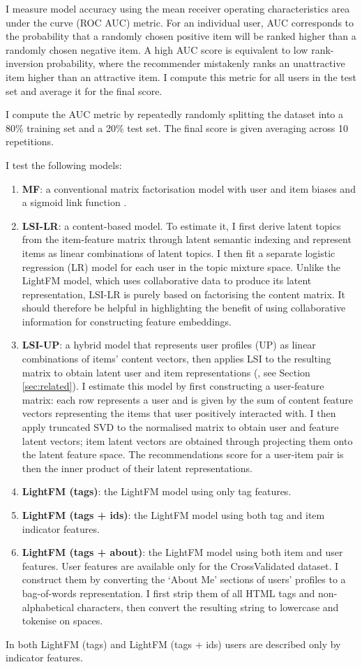 \documentclass{sig-alternate}
\begin{document}
I measure model accuracy using the mean receiver operating characteristics area under the curve (ROC AUC) metric. For an individual user, AUC corresponds to the probability that a randomly chosen positive item will be ranked higher than a randomly chosen negative item. A high AUC score is equivalent to low rank-inversion probability, where the recommender mistakenly ranks an unattractive item higher than an attractive item. I compute this metric for all users in the test set and average it for the final score.

I compute the AUC metric by repeatedly randomly splitting the dataset into a 80\% training set and a 20\% test set. The final score is given averaging across 10 repetitions.

I test the following models:
\begin{enumerate}
\item \textbf{MF}: a conventional matrix factorisation model with user and item biases and a sigmoid link function \cite{koren2009matrix}.
\item \textbf{LSI-LR}: a content-based model. To estimate it, I first derive latent topics from the item-feature matrix through latent semantic indexing and represent items as linear combinations of latent topics. I then fit a separate logistic regression (LR) model for each user in the topic mixture space. Unlike the LightFM model, which uses collaborative data to produce its latent representation, LSI-LR is purely based on factorising the content matrix. It should therefore be helpful in highlighting the benefit of using collaborative information for constructing feature embeddings.
\item \textbf{LSI-UP}: a hybrid model that represents user profiles (UP) as linear combinations of items' content vectors, then applies LSI to the resulting matrix to obtain latent user and item representations (\cite{soboroff1999combining}, see Section \ref{sec:related}). I estimate this model by first constructing a user-feature matrix: each row represents a user and is given by the sum of content feature vectors representing the items that user positively interacted with. I then apply truncated SVD to the normalised matrix to obtain user and feature latent vectors; item latent vectors are obtained through projecting them onto the latent feature space. The recommendations score for a user-item pair is then the inner product of their latent representations.
\item \textbf{LightFM (tags)}: the LightFM model using only tag features.
\item \textbf{LightFM (tags + ids)}: the LightFM model using both tag and item indicator features.
\item \textbf{LightFM (tags + about)}: the LightFM model using both item and user features. User features are available only for the CrossValidated dataset. I construct them by converting the `About Me' sections of users' profiles to a bag-of-words representation. I first strip them of all HTML tags and non-alphabetical characters, then convert the resulting string to lowercase and tokenise on spaces.
\end{enumerate}
In both LightFM (tags) and LightFM (tags + ids) users are described only by indicator features.
\end{document}
